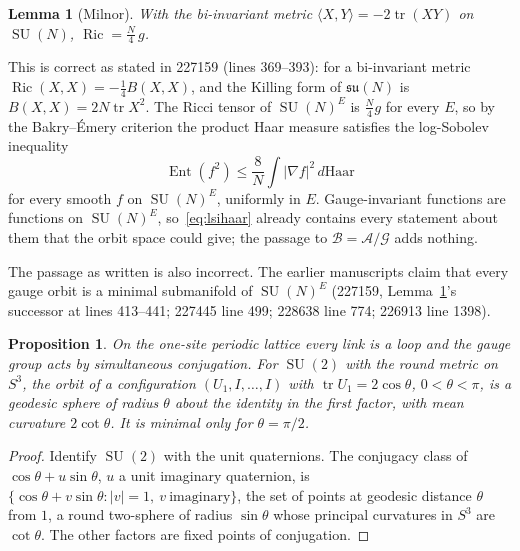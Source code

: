\documentclass[aps,prd,twocolumn,superscriptaddress,nofootinbib,floatfix]{revtex4-2}
\newtheorem{proposition}[theorem]{Proposition}
\newtheorem{lemma}[theorem]{Lemma}
\theoremstyle{definition}
\theoremstyle{remark}
\DeclareMathOperator{\SU}{SU}
\DeclareMathOperator{\Tr}{tr}
\DeclareMathOperator{\Ent}{Ent}
\DeclareMathOperator{\Ric}{Ric}
\newcommand{\cA}{\mathcal{A}}
\newcommand{\cB}{\mathcal{B}}
\newcommand{\cG}{\mathcal{G}}
\begin{document}
\begin{lemma}[Milnor]
\label{lem:milnor}
With the bi-invariant metric $\langle X,Y\rangle=-2\Tr(XY)$ on $\SU(N)$,
$\Ric=\tfrac N4\,g$.
\end{lemma}

This is correct as stated in 227159 (lines 369--393): for a bi-invariant
metric $\Ric(X,X)=-\tfrac14B(X,X)$, and the Killing form of $\mathfrak{su}(N)$
is $B(X,X)=2N\Tr X^2$. The Ricci tensor of $\SU(N)^E$ is $\tfrac N4g$ for
every $E$, so by the Bakry--\'Emery criterion the product Haar measure
satisfies the log-Sobolev inequality
\begin{equation}
\Ent(f^2)\le\frac{8}{N}\int|\nabla f|^2\,d\mathrm{Haar}
\label{eq:lsihaar}
\end{equation}
for every smooth $f$ on $\SU(N)^E$, uniformly in $E$. Gauge-invariant
functions are functions on $\SU(N)^E$, so~\eqref{eq:lsihaar} already
contains every statement about them that the orbit space could give; the
passage to $\cB=\cA/\cG$ adds nothing.

The passage as written is also incorrect. The earlier manuscripts claim
that every gauge orbit is a minimal submanifold of $\SU(N)^E$ (227159,
Lemma~\ref{lem:milnor}'s successor at lines 413--441; 227445 line 499;
228638 line 774; 226913 line 1398).

\begin{proposition}
\label{prop:notminimal}
On the one-site periodic lattice every link is a loop and the gauge group
acts by simultaneous conjugation. For $\SU(2)$ with the round metric on
$S^3$, the orbit of a configuration $(U_1,I,\dots,I)$ with
$\Tr U_1=2\cos\theta$, $0<\theta<\pi$, is a geodesic sphere of radius
$\theta$ about the identity in the first factor, with mean curvature
$2\cot\theta$. It is minimal only for $\theta=\pi/2$.
\end{proposition}

\begin{proof}
Identify $\SU(2)$ with the unit quaternions. The conjugacy class of
$\cos\theta+u\sin\theta$, $u$ a unit imaginary quaternion, is
$\{\cos\theta+v\sin\theta:|v|=1,\ v\ \text{imaginary}\}$, the set of points
at geodesic distance $\theta$ from $1$, a round two-sphere of radius
$\sin\theta$ whose principal curvatures in $S^3$ are $\cot\theta$. The
other factors are fixed points of conjugation.
\end{proof}
\end{document}
